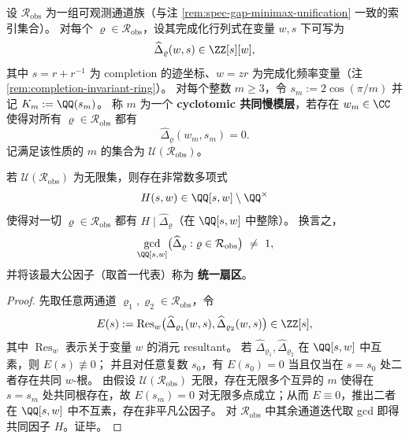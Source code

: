 \begin{definition}\label{def:cyclotomic-common-slowmode-layer}
设 \(\mathcal{R}_{\mathrm{obs}}\) 为一组可观测通道族（与注 \ref{rem:spec-gap-minimax-unification} 一致的索引集合）。
对每个 \(\varrho\in\mathcal{R}_{\mathrm{obs}}\)，设其完成化行列式在变量 \(w,s\) 下可写为
\[
\widehat{\Delta}_{\varrho}(w,s)\in\ZZ[s][w],
\]
其中 \(s=r+r^{-1}\) 为 completion 的迹坐标、\(w=zr\) 为完成化频率变量（注 \ref{rem:completion-invariant-ring}）。
对每个整数 \(m\ge 3\)，令 \(s_m:=2\cos(\pi/m)\) 并记 \(K_m:=\QQ(s_m)\)。
称 \(m\) 为一个 \textbf{cyclotomic 共同慢模层}，若存在 \(w_m\in\CC\) 使得对所有 \(\varrho\in\mathcal{R}_{\mathrm{obs}}\) 都有
\[
\widehat{\Delta}_{\varrho}(w_m,s_m)=0.
\]
记满足该性质的 \(m\) 的集合为 \(\mathcal{U}(\mathcal{R}_{\mathrm{obs}})\)。
\end{definition}

\begin{theorem}[循环特化刚性：无限多层共同慢模 \texorpdfstring{$\Rightarrow$}{=>} 统一扇区存在]\label{thm:cyclotomic-specialization-rigidity}
若 \(\mathcal{U}(\mathcal{R}_{\mathrm{obs}})\) 为无限集，则存在非常数多项式
\[
H(s,w)\in \QQ[s,w]\setminus\QQ^\times
\]
使得对一切 \(\varrho\in\mathcal{R}_{\mathrm{obs}}\) 都有 \(H\mid \widehat{\Delta}_{\varrho}\)（在 \(\QQ[s,w]\) 中整除）。
换言之，
\[
\gcd_{\QQ[s,w]}\bigl(\widehat{\Delta}_{\varrho}:\varrho\in\mathcal{R}_{\mathrm{obs}}\bigr)\ \neq\ 1,
\]
并将该最大公因子（取首一代表）称为 \textbf{统一扇区}。
\end{theorem}
\begin{proof}
先取任意两通道 \(\varrho_1,\varrho_2\in\mathcal{R}_{\mathrm{obs}}\)，令
\[
E(s):=\operatorname{Res}_{w}\bigl(\widehat{\Delta}_{\varrho_1}(w,s),\widehat{\Delta}_{\varrho_2}(w,s)\bigr)\in\ZZ[s],
\]
其中 \(\operatorname{Res}_{w}\) 表示关于变量 \(w\) 的消元 resultant。
若 \(\widehat{\Delta}_{\varrho_1},\widehat{\Delta}_{\varrho_2}\) 在 \(\QQ[s,w]\) 中互素，则 \(E(s)\not\equiv 0\)；
并且对任意复数 \(s_0\)，有 \(E(s_0)=0\) 当且仅当在 \(s=s_0\) 处二者存在共同 \(w\)-根。
由假设 \(\mathcal{U}(\mathcal{R}_{\mathrm{obs}})\) 无限，存在无限多个互异的 \(m\) 使得在 \(s=s_m\) 处共同根存在，故 \(E(s_m)=0\) 对无限多点成立；从而 \(E\equiv 0\)，推出二者在 \(\QQ[s,w]\) 中不互素，存在非平凡公因子。
对 \(\mathcal{R}_{\mathrm{obs}}\) 中其余通道迭代取 gcd 即得共同因子 \(H\)。证毕。
\end{proof}

